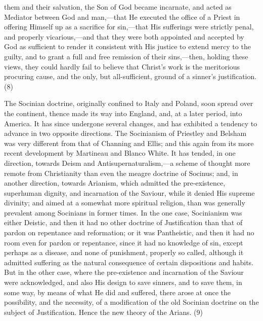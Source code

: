 \documentclass[
]{book}
\begin{document}
them and their salvation, the Son of God became incarnate, and acted as Mediator between God and man,---that He executed the office of a Priest in offering Himself up as a sacrifice for sin,---that His sufferings were strictly penal, and properly vicarious,---and that they were both appointed and accepted by God as sufficient to render it consistent with His justice to extend mercy to the guilty, and to grant a full and free remission of their sins,---then, holding these views, they could hardly fail to believe that Christ's work is the meritorious procuring cause, and the only, but all-sufficient, ground of a sinner's justification. (8)

The Socinian doctrine, originally confined to Italy and Poland, soon spread over the continent, thence made its way into England, and, at a later period, into America. It has since undergone several changes, and has exhibited a tendency to advance in two opposite directions. The Socinianism of Priestley and Belsham was very different from that of Channing and Ellis; and this again from its more recent development by Martineau and Blanco White. It has tended, in one direction, towards Deism and Antisupernaturalism,---a scheme of thought more remote from Christianity than even the meagre doctrine of Socinus; and, in another direction, towards Arianism, which admitted the pre-existence, superhuman dignity, and incarnation of the Saviour, while it denied His supreme divinity; and aimed at a somewhat more spiritual religion, than was generally prevalent among Socinians in former times. In the one case, Socinianism was either Deistic, and then it had no other doctrine of Justification than that of pardon on repentance and reformation; or it was Pantheistic, and then it had no room even for pardon or repentance, since it had no knowledge of sin, except perhaps as a disease, and none of punishment, properly so called, although it admitted suffering as the natural consequence of certain dispositions and habits. But in the other case, where the pre-existence and incarnation of the Saviour were acknowledged, and also His design to save sinners, and to save them, in some way, by means of what He did and suffered, there arose at once the possibility, and the necessity, of a modification of the old Socinian doctrine on the subject of Justification. Hence the new theory of the Arians. (9)
\end{document}

